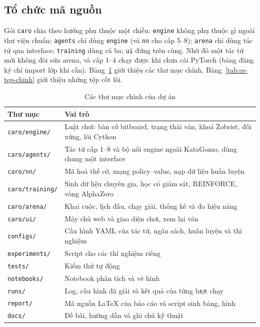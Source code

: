 \subsection{Tổ chức mã nguồn}
Gói \texttt{caro} chia theo hướng phụ thuộc một chiều: \texttt{engine} không phụ thuộc gì ngoài thư viện chuẩn;
\texttt{agents} chỉ dùng \texttt{engine} (và \texttt{nn} cho cấp 5--8); \texttt{arena} chỉ dùng tác tử qua
interface; \texttt{training} dùng cả ba; \texttt{ui} đứng trên cùng. Nhờ đó một tác tử mới không đòi sửa arena, và
cấp 1--4 chạy được khi chưa cài PyTorch (bảng đăng ký chỉ import lớp khi cần). Bảng~\ref{tab:cs-thu-muc} giới thiệu
các thư mục chính, Bảng~\ref{tab:cs-tep-chinh} giới thiệu những tệp cốt lõi.
\begin{table}[H]
  \centering\small
  \caption{Các thư mục chính của dự án}
  \label{tab:cs-thu-muc}
  \begin{tabular}{lp{10cm}}
    \toprule
    Thư mục & Vai trò\\
    \midrule
    \texttt{caro/engine/} & Luật chơi: bàn cờ bitboard, trạng thái ván, khoá Zobrist, đối xứng, lõi Cython\\
    \texttt{caro/agents/} & Tác tử cấp 1--8 và bộ nối engine ngoài KataGomo, dùng chung một interface\\
    \texttt{caro/nn/} & Mã hoá thế cờ, mạng policy--value, nạp dữ liệu huấn luyện\\
    \texttt{caro/training/} & Sinh dữ liệu chuyên gia, học có giám sát, REINFORCE, vòng AlphaZero\\
    \texttt{caro/arena/} & Khai cuộc, lịch đấu, chạy giải, thống kê và đo hiệu năng\\
    \texttt{caro/ui/} & Máy chủ web và giao diện chơi, xem lại ván\\
    \midrule
    \texttt{configs/} & Cấu hình YAML của tác tử, ngân sách, huấn luyện và thí nghiệm\\
    \texttt{experiments/} & Script cho các thí nghiệm riêng\\
    \texttt{tests/} & Kiểm thử tự động\\
    \texttt{notebooks/} & Notebook phân tích và vẽ hình\\
    \texttt{runs/} & Log, cấu hình đã giải và kết quả của từng lượt chạy\\
    \texttt{report/} & Mã nguồn LaTeX của báo cáo và script sinh bảng, hình\\
    \texttt{docs/} & Đề bài, hướng dẫn và ghi chú kỹ thuật\\
    \bottomrule
  \end{tabular}
\end{table}
